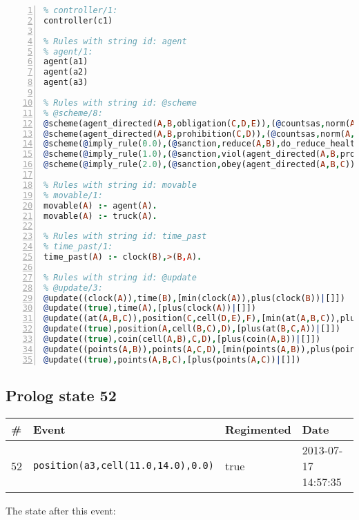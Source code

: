 \documentclass[11pt]{article}\usepackage[utf8]{inputenc}\usepackage{geometry}
\begin{document}
\begin{lstlisting}[language=Prolog, numbers=left]
% Rules with string id: controller
% controller/1:
controller(c1)

% Rules with string id: agent
% agent/1:
agent(a1)
agent(a2)
agent(a3)

% Rules with string id: @scheme
% @scheme/8:
@scheme(agent_directed(A,B,obligation(C,D,E)),(@countsas,norm(A,B,F,obligation(C,D,E)),F),false,(listTrue(C)),(time_past(D)),false,[plus(viol(agent_directed(A,B,obligation(C,D,E))))|[]],[plus(obey(agent_directed(A,B,obligation(C,D,E))))|[]])
@scheme(agent_directed(A,B,prohibition(C,D)),(@countsas,norm(A,B,E,prohibition(C,D)),E),(listTrue(C)),false,(false),false,[plus(viol(agent_directed(A,B,prohibition(C,D))))|[]],[plus(obey(agent_directed(A,B,prohibition(C,D))))|[]])
@scheme(@imply_rule(0.0),(@sanction,reduce(A,B),do_reduce_health(A,B),notifyAgent(A,changed(status))),true,false,false,false,[min(reduce(A,B))|[]],[])
@scheme(@imply_rule(1.0),(@sanction,viol(agent_directed(A,B,prohibition(C,D))),do_sanction(D)),true,false,false,false,[min(viol(agent_directed(A,B,prohibition(C,D))))|[]],[])
@scheme(@imply_rule(2.0),(@sanction,obey(agent_directed(A,B,C))),true,false,false,false,[min(obey(agent_directed(A,B,C)))|[]],[])

% Rules with string id: movable
% movable/1:
movable(A) :- agent(A).
movable(A) :- truck(A).

% Rules with string id: time_past
% time_past/1:
time_past(A) :- clock(B),>(B,A).

% Rules with string id: @update
% @update/3:
@update((clock(A)),time(B),[min(clock(A)),plus(clock(B))|[]])
@update((true),time(A),[plus(clock(A))|[]])
@update((at(A,B,C)),position(C,cell(D,E),F),[min(at(A,B,C)),plus(at(D,E,C))|[]])
@update((true),position(A,cell(B,C),D),[plus(at(B,C,A))|[]])
@update((true),coin(cell(A,B),C,D),[plus(coin(A,B))|[]])
@update((points(A,B)),points(A,C,D),[min(points(A,B)),plus(points(A,D))|[]])
@update((true),points(A,B,C),[plus(points(A,C))|[]])

\end{lstlisting}
\clearpage 
\subsection{Prolog state 52}
\begin{table}[ht]
\centering 
\begin{tabular}{l l l l} 
\textbf{\#} & \textbf{Event} & \textbf{Regimented} & \textbf{Date} \\ [0.5ex] 
\hline
52&\texttt{position(a3,cell(11.0,14.0),0.0)}&true&2013-07-17 14:57:35\\ [1ex] \hline\end{tabular}
\end{table}
The state after this event:
\end{document}
